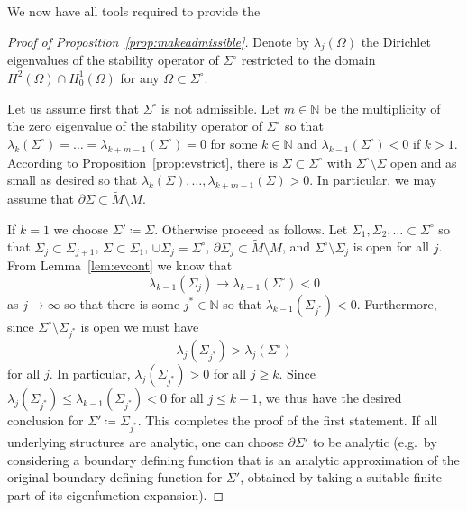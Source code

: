 \documentclass[11pt]{amsart}
\theoremstyle{definition}
\numberwithin{equation}{section}
\newcommand{\p}{\partial}
\begin{document}
We now have all tools required to provide the
\begin{proof}[Proof of Proposition~\ref{prop:makeadmissible}]
    Denote by $\lambda_j(\Omega)$ the Dirichlet eigenvalues of the stability operator of $\Sigma^\circ$ restricted to the domain $H^2(\Omega)\cap H^1_0(\Omega)$ for any $\Omega\subset \Sigma^\circ$. 
    
    Let us assume first that $\Sigma^\circ$ is not admissible. Let $m\in \mathbb{N}$ be the multiplicity of the zero eigenvalue of the stability operator of $\Sigma^\circ$ so that $\lambda_k(\Sigma^\circ) = \dots = \lambda_{k+m-1}(\Sigma^\circ)=0$ for some $k\in \mathbb{N}$ and $\lambda_{k-1}(\Sigma^\circ)<0$ if $k>1$. According to Proposition~\ref{prop:evstrict}, there is $\Sigma\subset \Sigma^\circ$ with $\Sigma^\circ\setminus\Sigma$ open and as small as desired so that $\lambda_k(\Sigma), \dots, \lambda_{k+m-1}(\Sigma)>0$. In particular, we may assume that $\p \Sigma \subset \widetilde{M} \setminus M$.

    If $k=1$ we choose $\Sigma'\coloneqq \Sigma$. Otherwise proceed as follows. Let $\Sigma_1, \Sigma_2, \dots \subset \Sigma^\circ$ so that $\Sigma_{j}\subset \Sigma_{j+1}$, $\Sigma \subset \Sigma_1$, $\cup \Sigma_j = \Sigma^{\circ}$, $\p \Sigma_j \subset \widetilde{M} \setminus M$, and $\Sigma^\circ\setminus\Sigma_j$ is open for all $j$. From Lemma~\ref{lem:evcont} we know that
    \[
        \lambda_{k-1}(\Sigma_j) \to \lambda_{k-1}(\Sigma^\circ) < 0
    \]
    as $j\to \infty$ so that there is some $j^\ast \in \mathbb{N}$ so that $\lambda_{k-1}(\Sigma_{j^\ast}) < 0$. Furthermore, since $\Sigma^\circ\setminus \Sigma_{j^\ast}$ is open we must have 
    \[
        \lambda_{j}(\Sigma_{j^\ast}) > \lambda_j(\Sigma^\circ)
    \]
    for all $j$. In particular, $\lambda_{j}(\Sigma_{j^\ast}) > 0$ for all $j \geq k$. Since $\lambda_{j}(\Sigma_{j^\ast}) \leq \lambda_{k-1}(\Sigma_{j^\ast}) < 0$ for all $j\leq k-1$, we thus have the desired conclusion for $\Sigma' \coloneqq \Sigma_{j^\ast}$. 
    This completes the proof of the first statement. If all underlying structures are analytic, one can choose $\p \Sigma'$ to be analytic (e.g.\ by considering a boundary defining function that is an analytic approximation of the original boundary defining function for $\Sigma'$, obtained by taking a suitable finite part of its eigenfunction expansion).

\end{proof}













 
        

\end{document}
